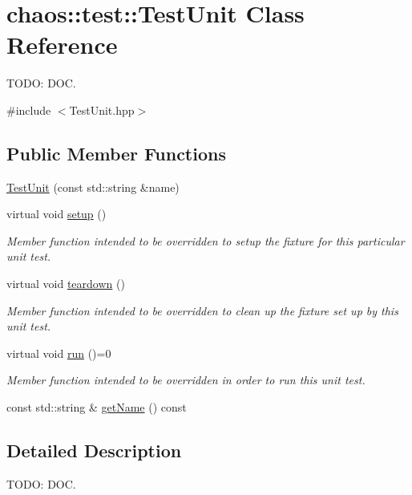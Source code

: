 \hypertarget{classchaos_1_1test_1_1_test_unit}{\section{chaos\-:\-:test\-:\-:Test\-Unit Class Reference}
\label{classchaos_1_1test_1_1_test_unit}
}


T\-O\-D\-O\-: D\-O\-C.  




{\ttfamily \#include $<$Test\-Unit.\-hpp$>$}

\subsection*{Public Member Functions}
\begin{DoxyCompactItemize}
\item 
\hyperlink{classchaos_1_1test_1_1_test_unit_a08d73d7b6ad46db691afbd6b066567f3}{Test\-Unit} (const std\-::string \&name)
\item 
virtual void \hyperlink{classchaos_1_1test_1_1_test_unit_a2aecefcc01a9a7fa64bc8108af22f355}{setup} ()
\begin{DoxyCompactList}\small\item\em Member function intended to be overridden to setup the fixture for this particular unit test. \end{DoxyCompactList}\item 
virtual void \hyperlink{classchaos_1_1test_1_1_test_unit_ad19e85804ac830e411a696acad7d03e6}{teardown} ()
\begin{DoxyCompactList}\small\item\em Member function intended to be overridden to clean up the fixture set up by this unit test. \end{DoxyCompactList}\item 
virtual void \hyperlink{classchaos_1_1test_1_1_test_unit_a7c46611836ac7a9a527115098f83564c}{run} ()=0
\begin{DoxyCompactList}\small\item\em Member function intended to be overridden in order to run this unit test. \end{DoxyCompactList}\item 
const std\-::string \& \hyperlink{classchaos_1_1test_1_1_test_unit_a83d464bf139412c1fdaae047e7153b0a}{get\-Name} () const 
\end{DoxyCompactItemize}


\subsection{Detailed Description}
T\-O\-D\-O\-: D\-O\-C. 

